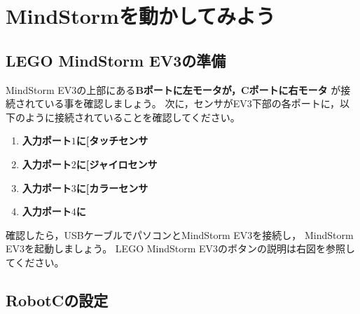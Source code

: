 \documentclass[11pt]{jsarticle}
\makeatletter
\def\nmindex{\@ifnextchar[{\@nmindex}{\@@nmindex}}
\def\@nmindex[#1]#2{#2\index{#1@#2}}
\def\@@nmindex#1{#1\index{#1}}
\makeatother
\begin{document}
\section{MindStormを動かしてみよう}
\begin{figure}\vspace{-.2cm}
\begin{center}
\end{center}
\end{figure}
\subsection{LEGO MindStorm EV3の準備}

MindStorm EV3の上部にある\textbf{Bポートに左モータが，Cポートに右モータ}
が接続されている事を確認しましょう。
次に，センサがEV3下部の各ポートに，以下のように接続されていることを確認してください。
\begin{enumerate}
\item \textbf{入力ポート$1$に\nmindex{タッチセンサ}}
\item \textbf{入力ポート$2$に\nmindex{ジャイロセンサ}}
\item \textbf{入力ポート$3$に\nmindex{カラーセンサ}}
\item \textbf{入力ポート$4$に\nmindex[ちょうおんぱせんさ]{超音波センサ}}
\end{enumerate}

確認したら，USBケーブルでパソコンとMindStorm EV3を接続し，
MindStorm EV3を起動しましょう。
LEGO MindStorm EV3のボタンの説明は右図を参照してください。


\subsection{RobotCの設定\label{sec:bricx}}
\end{document}
